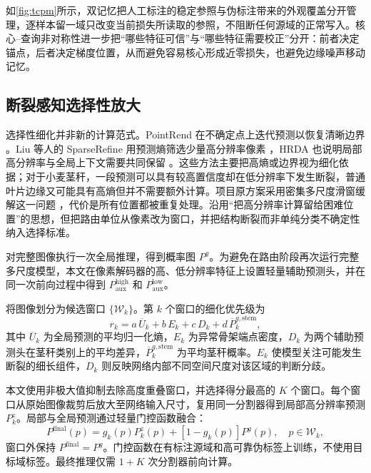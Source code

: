 如\cref{fig:tcpm}所示，双记忆把人工标注的稳定参照与伪标注带来的外观覆盖分开管理，逐样本留一域只改变当前损失所读取的参照，不阻断任何源域的正常写入。核心--查询非对称性进一步把“哪些特征可信”与“哪些特征需要校正”分开：前者决定锚点，后者决定梯度位置，从而避免容易核心形成近零损失，也避免边缘噪声移动记忆。

\subsection{断裂感知选择性放大}
\label{sec:bazr}

选择性细化并非新的计算范式。PointRend 在不确定点上迭代预测以恢复清晰边界 \citep{kirillov2020pointrend}。Liu 等人的 SparseRefine 用预测熵筛选少量高分辨率像素 \citep{liu2024sparserefine}，HRDA 也说明局部高分辨率与全局上下文需要共同保留 \citep{hoyer2022hrda}。这些方法主要把高熵或边界视为细化依据；对于小麦茎秆，一段预测可以具有较高置信度却在低分辨率下发生断裂，普通叶片边缘又可能具有高熵但并不需要额外计算。项目原方案采用密集多尺度滑窗缓解这一问题 \citep{cao2025detailminority}，代价是所有位置都被重复处理。\BAZR 沿用“把高分辨率计算留给困难位置”的思想，但把路由单位从像素改为窗口，并把结构断裂而非单纯分类不确定性纳入选择标准。

\BAZR 对完整图像执行一次全局推理，得到概率图 $P^g$。为避免在路由阶段再次运行完整多尺度模型，本文在像素解码器的高、低分辨率特征上设置轻量辅助预测头，并在同一次前向过程中得到 $P^{\mathrm{high}}_{\mathrm{aux}}$ 和 $P^{\mathrm{low}}_{\mathrm{aux}}$。

将图像划分为候选窗口 $\{\mathcal W_k\}$。第 $k$ 个窗口的细化优先级为
\begin{equation}
r_k=
a\,\overline U_k
+b\,E_k
+c\,D_k
+d\,\overline P^{g,\mathrm{stem}}_k,
\label{eq:routingscore}
\end{equation}
其中 $\overline U_k$ 为全局预测的平均归一化熵，$E_k$ 为异常骨架端点密度，$D_k$ 为两个辅助预测头在茎秆类别上的平均差异，$\overline P^{g,\mathrm{stem}}_k$ 为平均茎秆概率。$E_k$ 使模型关注可能发生断裂的细长组件，$D_k$ 则反映网络内部不同空间尺度对该区域的判断分歧。

本文使用非极大值抑制去除高度重叠窗口，并选择得分最高的 $K$ 个窗口。每个窗口从原始图像裁剪后放大至网络输入尺寸，复用同一分割器得到局部高分辨率预测 $P_k^z$。局部与全局预测通过轻量门控函数融合：
\begin{equation}
P^{\mathrm{final}}(p)=
g_k(p)P_k^z(p)
+[1-g_k(p)]P^g(p),
\quad p\in\mathcal W_k,
\label{eq:fusion}
\end{equation}
窗口外保持 $P^{\mathrm{final}}=P^g$。门控函数在有标注源域和高可靠伪标签上训练，不使用目标域标签。最终推理仅需 $1+K$ 次分割器前向计算。


